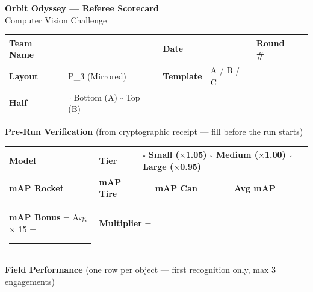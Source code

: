 \documentclass[a4]{article}
\begin{document}
\thispagestyle{empty}
\begin{center}
{\Large \textbf{Orbit Odyssey --- Referee Scorecard}} \\[2pt]
{\small Computer Vision Challenge}
\end{center}

\vspace{0.4em}

{\small
\begin{tabular}{|p{2.2cm}|p{4.8cm}|p{2.2cm}|p{2.5cm}|p{1.5cm}|p{3cm}|}
\hline
\textbf{Team Name} & \rule{0pt}{14pt} & \textbf{Date} & & \textbf{Round \#} & \\
\hline
\textbf{Layout} & P\_3 (Mirrored) & \textbf{Template} & A / B / C & & \\
\hline
\textbf{Half} & $\square$ Bottom (A) \quad $\square$ Top (B) & & & & \\
\hline
\end{tabular}
}

\vspace{0.5em}

{\small \textbf{Pre-Run Verification} {\scriptsize (from cryptographic receipt --- fill before the run starts)}}

\vspace{0.2em}

{\small
\begin{tabular}{|p{2.2cm}|p{3.5cm}|p{1cm}|p{1.2cm}|p{1cm}|p{1.2cm}|p{1.5cm}|p{1.2cm}|}
\hline
\textbf{Model} & \rule{0pt}{14pt} & \textbf{Tier} & \multicolumn{5}{l|}{$\square$ Small ($\times$1.05) \quad $\square$ Medium ($\times$1.00) \quad $\square$ Large ($\times$0.95)} \\
\hline
\textbf{mAP Rocket} & & \textbf{mAP Tire} & & \textbf{mAP Can} & & \textbf{Avg mAP} & \\
\hline
\multicolumn{2}{|l|}{\textbf{mAP Bonus} = Avg $\times$ 15 = \rule{1.5cm}{0.4pt}} & \multicolumn{6}{l|}{\textbf{Multiplier} = \rule{1.5cm}{0.4pt}} \\
\hline
\end{tabular}
}

\vspace{0.5em}

{\small \textbf{Field Performance} {\scriptsize (one row per object --- first recognition only, max 3 engagements)}}

\vspace{0.2em}
\end{document}
